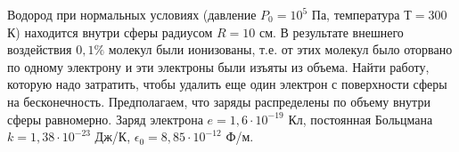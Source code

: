 
Водород при нормальных условиях (давление $P_0=10^5$ Па, температура $Т=300$ К) находится внутри сферы радиусом $R=10$ см. В результате внешнего воздействия $0,1\%$ молекул 
были ионизованы, т.е. от этих молекул было оторвано по одному электрону и эти электроны были изъяты из объема. Найти работу, которую надо затратить, чтобы удалить еще 
один электрон с поверхности сферы на бесконечность. Предполагаем, что заряды распределены по объему внутри сферы равномерно. Заряд электрона $e = 1,6 \cdot 10^{-19}$ Кл, постоянная 
Больцмана $k=1,38 \cdot 10^{-23}$ Дж/К, $\epsilon_0=8,85 \cdot 10^{-12}$ Ф/м.
